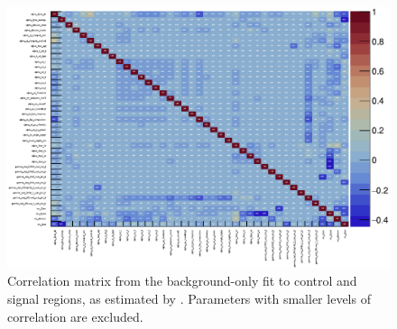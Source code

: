 \begin{figure}[tp]
\centering
\includegraphics[width=\textwidth]{figures/2ljets_fit_corrmatrix.pdf}
\caption[
Correlation matrix from the background-only fit to control and signal regions
]{%
Correlation matrix from the background-only fit to control and signal regions,
as estimated by \histfitter.
Parameters with smaller levels of correlation are excluded.
}
\label{fig:2ljets_fit_corrmatrix}
\end{figure}

